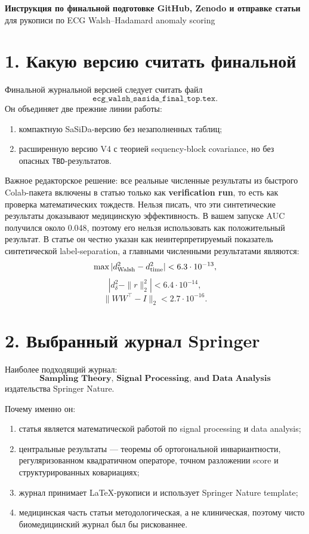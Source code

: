 \documentclass[12pt,a4paper]{article}
\begin{document}

\begin{center}
{\Large\bfseries Инструкция по финальной подготовке GitHub, Zenodo и отправке статьи}\\[4pt]
{\large для рукописи по ECG Walsh--Hadamard anomaly scoring}\\[6pt]
\end{center}

\section*{1. Какую версию считать финальной}

Финальной журнальной версией следует считать файл
\[
\texttt{ecg\_walsh\_sasida\_final\_top.tex}.
\]
Он объединяет две прежние линии работы:

\begin{enumerate}[label=\arabic*)]
\item компактную SaSiDa-версию без незаполненных таблиц;
\item расширенную версию V4 с теорией sequency-block covariance, но без опасных \texttt{TBD}-результатов.
\end{enumerate}

Важное редакторское решение: все реальные численные результаты из быстрого Colab-пакета включены в статью только как \textbf{verification run}, то есть как проверка математических тождеств. Нельзя писать, что эти синтетические результаты доказывают медицинскую эффективность. В вашем запуске AUC получился около 0.048, поэтому его нельзя использовать как положительный результат. В статье он честно указан как неинтерпретируемый показатель синтетической label-separation, а главными численными результатами являются:
\[
\max |d^2_{\rm Walsh}-d^2_{\rm time}|<6.3\cdot 10^{-13},
\]
\[
|d^2_\delta-\|r\|_2^2|<6.4\cdot 10^{-14},
\]
\[
\|WW^\top-I\|_2<2.7\cdot 10^{-16}.
\]

\section*{2. Выбранный журнал Springer}

Наиболее подходящий журнал:
\[
\textbf{Sampling Theory, Signal Processing, and Data Analysis}
\]
издательства Springer Nature.

Почему именно он:
\begin{enumerate}[label=\arabic*)]
\item статья является математической работой по signal processing и data analysis;
\item центральные результаты --- теоремы об ортогональной инвариантности, регуляризованном квадратичном операторе, точном разложении score и структурированных ковариациях;
\item журнал принимает LaTeX-рукописи и использует Springer Nature template;
\item медицинская часть статьи методологическая, а не клиническая, поэтому чисто биомедицинский журнал был бы рискованнее.
\end{enumerate}
\end{document}
